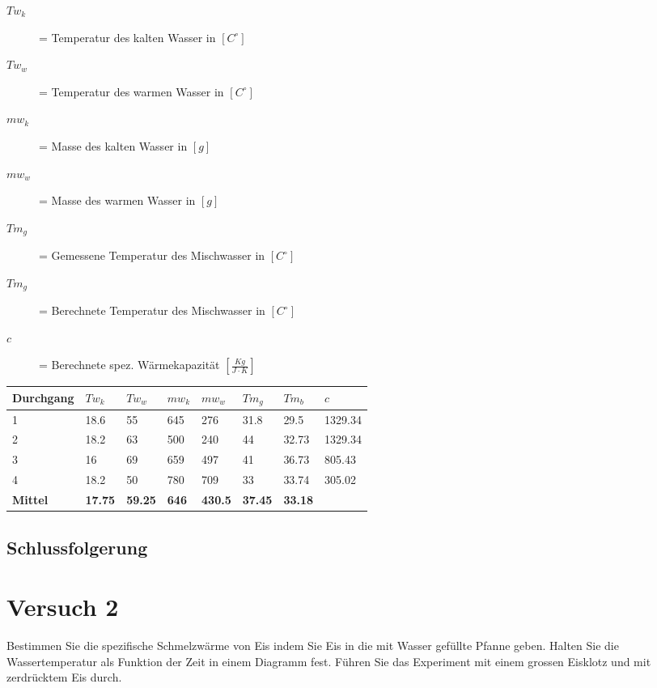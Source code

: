 \documentclass{article}
\begin{document}
  \begin{description}
    \item[\textbf{ $Tw_k$}]= Temperatur des kalten Wasser in $[C^\circ]$
    \item[\textbf{ $Tw_w$}]= Temperatur des warmen Wasser in $[C^\circ]$
    \item[\textbf{ $mw_k$}]= Masse des kalten Wasser in $[g]$
    \item[\textbf{ $mw_w$}]= Masse des warmen Wasser in $[g]$
    \item[\textbf{ $Tm_g$}]= Gemessene Temperatur des Mischwasser in  $[C^\circ]$
    \item[\textbf{ $Tm_g$}]= Berechnete Temperatur des Mischwasser in  $[C^\circ]$
    \item[\textbf{ $c$}]=  Berechnete spez. Wärmekapazität  $[\frac{Kg}{J \cdot K}]$
    
  \end{description}
\begin{table}[h]
    \begin{tabular}{|l|l|l|l|l|l|l|l|}
    
        \hline
        Durchgang &\textbf{$Tw_k$} &\textbf{$Tw_w$}& \textbf{$mw_k$}&\textbf{$mw_w$}&\textbf{$Tm_g$}&\textbf{$Tm_b$}&\textbf{$c$}\\ \hline
        1         & 18.6 & 55 & 645& 276 & 31.8 &29.5&1329.34\\ 
        2         & 18.2 & 63 &500 &240  & 44 &32.73&1329.34\\ 
        3         & 16 & 69 &659 &497  &41 &36.73&805.43\\ 
        4         &  18.2  &50 & 780 & 709 &33&33.74&305.02\\ \hline
        \textbf{Mittel} &\textbf{17.75}&\textbf{59.25}&\textbf{646}  &\textbf{430.5}  &\textbf{37.45} &\textbf{33.18}&\textbf{} \\ 
        \hline
    \end{tabular}
\end{table}

\subsection*{Schlussfolgerung}

\section{Versuch 2}
Bestimmen Sie die spezifische Schmelzwärme von Eis indem Sie Eis in die mit Wasser gefüllte Pfanne geben.
Halten Sie die Wassertemperatur als Funktion der Zeit in einem Diagramm fest. Führen Sie das Experiment
mit einem grossen Eisklotz und mit zerdrücktem Eis durch.
\end{document}

